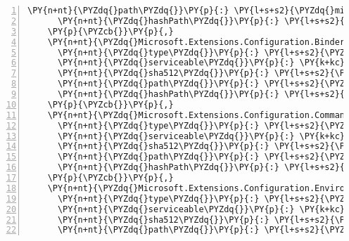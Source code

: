 \begin{Verbatim}[commandchars=\\\{\},numbers=left,firstnumber=1,stepnumber=1,numberblanklines=0]
      \PY{n+nt}{\PYZdq{}path\PYZdq{}}\PY{p}{:} \PY{l+s+s2}{\PYZdq{}microsoft.extensions.configuration.abstractions/2.1.0\PYZhy{}rc1\PYZhy{}final\PYZdq{}}\PY{p}{,}
      \PY{n+nt}{\PYZdq{}hashPath\PYZdq{}}\PY{p}{:} \PY{l+s+s2}{\PYZdq{}microsoft.extensions.configuration.abstractions.2.1.0\PYZhy{}rc1\PYZhy{}final.nupkg.sha512\PYZdq{}}
    \PY{p}{\PYZcb{}}\PY{p}{,}
    \PY{n+nt}{\PYZdq{}Microsoft.Extensions.Configuration.Binder/2.1.0\PYZhy{}rc1\PYZhy{}final\PYZdq{}}\PY{p}{:} \PY{p}{\PYZob{}}
      \PY{n+nt}{\PYZdq{}type\PYZdq{}}\PY{p}{:} \PY{l+s+s2}{\PYZdq{}package\PYZdq{}}\PY{p}{,}
      \PY{n+nt}{\PYZdq{}serviceable\PYZdq{}}\PY{p}{:} \PY{k+kc}{true}\PY{p}{,}
      \PY{n+nt}{\PYZdq{}sha512\PYZdq{}}\PY{p}{:} \PY{l+s+s2}{\PYZdq{}sha512\PYZhy{}hN4BYDuzGUUxml9HgzINzm5zQI1N7vW1pqena/HfvjAz+N4oGqseDxiY1c4XCGKWRCZ9Y2o7foKl/vdZCo34OA==\PYZdq{}}\PY{p}{,}
      \PY{n+nt}{\PYZdq{}path\PYZdq{}}\PY{p}{:} \PY{l+s+s2}{\PYZdq{}microsoft.extensions.configuration.binder/2.1.0\PYZhy{}rc1\PYZhy{}final\PYZdq{}}\PY{p}{,}
      \PY{n+nt}{\PYZdq{}hashPath\PYZdq{}}\PY{p}{:} \PY{l+s+s2}{\PYZdq{}microsoft.extensions.configuration.binder.2.1.0\PYZhy{}rc1\PYZhy{}final.nupkg.sha512\PYZdq{}}
    \PY{p}{\PYZcb{}}\PY{p}{,}
    \PY{n+nt}{\PYZdq{}Microsoft.Extensions.Configuration.CommandLine/2.1.0\PYZhy{}rc1\PYZhy{}final\PYZdq{}}\PY{p}{:} \PY{p}{\PYZob{}}
      \PY{n+nt}{\PYZdq{}type\PYZdq{}}\PY{p}{:} \PY{l+s+s2}{\PYZdq{}package\PYZdq{}}\PY{p}{,}
      \PY{n+nt}{\PYZdq{}serviceable\PYZdq{}}\PY{p}{:} \PY{k+kc}{true}\PY{p}{,}
      \PY{n+nt}{\PYZdq{}sha512\PYZdq{}}\PY{p}{:} \PY{l+s+s2}{\PYZdq{}sha512\PYZhy{}dPkbq0nMIxfDOxZDXflPKPWe/rP254AG6a5sdfOB8hrwfc1S1gXA6VtmAlVbSIugfbULdDW05cIRZ5GF739T4g==\PYZdq{}}\PY{p}{,}
      \PY{n+nt}{\PYZdq{}path\PYZdq{}}\PY{p}{:} \PY{l+s+s2}{\PYZdq{}microsoft.extensions.configuration.commandline/2.1.0\PYZhy{}rc1\PYZhy{}final\PYZdq{}}\PY{p}{,}
      \PY{n+nt}{\PYZdq{}hashPath\PYZdq{}}\PY{p}{:} \PY{l+s+s2}{\PYZdq{}microsoft.extensions.configuration.commandline.2.1.0\PYZhy{}rc1\PYZhy{}final.nupkg.sha512\PYZdq{}}
    \PY{p}{\PYZcb{}}\PY{p}{,}
    \PY{n+nt}{\PYZdq{}Microsoft.Extensions.Configuration.EnvironmentVariables/2.1.0\PYZhy{}rc1\PYZhy{}final\PYZdq{}}\PY{p}{:} \PY{p}{\PYZob{}}
      \PY{n+nt}{\PYZdq{}type\PYZdq{}}\PY{p}{:} \PY{l+s+s2}{\PYZdq{}package\PYZdq{}}\PY{p}{,}
      \PY{n+nt}{\PYZdq{}serviceable\PYZdq{}}\PY{p}{:} \PY{k+kc}{true}\PY{p}{,}
      \PY{n+nt}{\PYZdq{}sha512\PYZdq{}}\PY{p}{:} \PY{l+s+s2}{\PYZdq{}sha512\PYZhy{}vw/D5vn1xrnFIhFn1xn+7CfI/WJ9RNIeyAzuSA2AZVJHKM94BCXsrnpFrJfZP0oFMeBA0o+MEECWiqisOMpiWQ==\PYZdq{}}\PY{p}{,}
      \PY{n+nt}{\PYZdq{}path\PYZdq{}}\PY{p}{:} \PY{l+s+s2}{\PYZdq{}microsoft.extensions.configuration.environmentvariables/2.1.0\PYZhy{}rc1\PYZhy{}final\PYZdq{}}\PY{p}{,}

\end{Verbatim}
